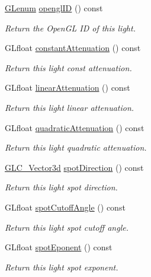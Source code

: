 \begin{DoxyCompactItemize}
\hyperlink{glext_8h_a508b2dec21679e2e346cad3e0d1969bf}{G\-Lenum} \hyperlink{class_g_l_c___light_a33e1b8ed723241c12939f41f25248251}{opengl\-I\-D} () const 
\begin{DoxyCompactList}\small\item\em Return the Open\-G\-L I\-D of this light. \end{DoxyCompactList}\item 
G\-Lfloat \hyperlink{class_g_l_c___light_ac2206e42a1100b0ed372009c88eb956a}{constant\-Attenuation} () const 
\begin{DoxyCompactList}\small\item\em Return this light const attenuation. \end{DoxyCompactList}\item 
G\-Lfloat \hyperlink{class_g_l_c___light_a38480562144c14ca8f1e2b9379757665}{linear\-Attenuation} () const 
\begin{DoxyCompactList}\small\item\em Return this light linear attenuation. \end{DoxyCompactList}\item 
G\-Lfloat \hyperlink{class_g_l_c___light_a48f7482111079034f8dca2018f6cc4cc}{quadratic\-Attenuation} () const 
\begin{DoxyCompactList}\small\item\em Return this light quadratic attenuation. \end{DoxyCompactList}\item 
\hyperlink{class_g_l_c___vector3d}{G\-L\-C\-\_\-\-Vector3d} \hyperlink{class_g_l_c___light_a82a8133ea5283e6bb2ba19799e46a6dc}{spot\-Direction} () const 
\begin{DoxyCompactList}\small\item\em Return this light spot direction. \end{DoxyCompactList}\item 
G\-Lfloat \hyperlink{class_g_l_c___light_aa72d0878ac1fb804273def2ca3778cd8}{spot\-Cutoff\-Angle} () const 
\begin{DoxyCompactList}\small\item\em Return this light spot cutoff angle. \end{DoxyCompactList}\item 
G\-Lfloat \hyperlink{class_g_l_c___light_aa87e28c1ea754fb0c691bfc3fa7158a3}{spot\-Eponent} () const 
\begin{DoxyCompactList}\small\item\em Return this light spot exponent. \end{DoxyCompactList}\item 

\end{DoxyCompactItemize}
